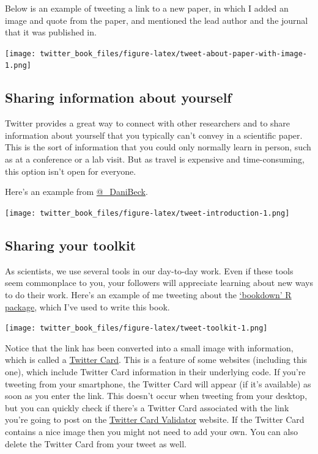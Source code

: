 \documentclass[
]{book}
\begin{document}
Below is an example of tweeting a link to a new paper, in which I added an image and quote from the paper, and mentioned the lead author and the journal that it was published in.

\texttt{[image: twitter\_book\_files/figure-latex/tweet-about-paper-with-image-1.png]}

\hypertarget{sharing-information-about-yourself}{%
\subsection{Sharing information about yourself}\label{sharing-information-about-yourself}}

Twitter provides a great way to connect with other researchers and to share information about yourself that you typically can't convey in a scientific paper. This is the sort of information that you could only normally learn in person, such as at a conference or a lab visit. But as travel is expensive and time-consuming, this option isn't open for everyone.

Here's an example from \href{https://twitter.com/_DaniBeck}{@\_DaniBeck}.

\texttt{[image: twitter\_book\_files/figure-latex/tweet-introduction-1.png]}

\hypertarget{sharing-your-toolkit}{%
\subsection{Sharing your toolkit}\label{sharing-your-toolkit}}

As scientists, we use several tools in our day-to-day work. Even if these tools seem commonplace to you, your followers will appreciate learning about new ways to do their work. Here's an example of me tweeting about the \href{https://bookdown.org/home/}{`bookdown' R package}, which I've used to write this book.

\texttt{[image: twitter\_book\_files/figure-latex/tweet-toolkit-1.png]}

Notice that the link has been converted into a small image with information, which is called a \href{https://developer.twitter.com/en/docs/tweets/optimize-with-cards/overview/abouts-cards}{Twitter Card}. This is a feature of some websites (including this one), which include Twitter Card information in their underlying code. If you're tweeting from your smartphone, the Twitter Card will appear (if it's available) as soon as you enter the link. This doesn't occur when tweeting from your desktop, but you can quickly check if there's a Twitter Card associated with the link you're going to post on the \href{https://cards-dev.twitter.com/validator}{Twitter Card Validator} website. If the Twitter Card contains a nice image then you might not need to add your own. You can also delete the Twitter Card from your tweet as well.
\end{document}
